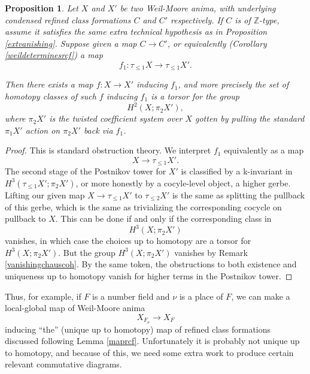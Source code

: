 \documentclass[12pt]{article}
\newtheorem{proposition}[theorem]{Proposition}
\theoremstyle{definition}
\newcommand{\mbb}{\mathbb}
\begin{document}
\begin{proposition}
Let $X$ and $X'$ be two Weil-Moore anima, with underlying condensed refined class formations $C$ and $C'$ respectively.  If $C$ is of $\mbb{Z}$-type, assume it satisfies the same extra technical hypothesis as in Proposition \ref{extvanishing}.  Suppose given a map $C\to C'$, or equivalently (Corollary \ref{weildeterminesrcf}) a map
$$f_1: \tau_{\leq 1}X \to \tau_{\leq 1}X'.$$

Then there exists a map $f:X\to X'$ inducing $f_1$, and more precisely the set of homotopy classes of such $f$ inducing $f_1$ is a torsor for the group  
$$H^2(X;\pi_2X'),$$
where $\pi_2X'$ is the twisted coefficient system over $X$ gotten by pulling the standard $\pi_1X'$ action on $\pi_2X'$ back via $f_1$.
\end{proposition}
\begin{proof}
This is standard obstruction theory.  We interpret $f_1$ equivalently as a map
$$X\to \tau_{\leq 1}X'.$$
The second stage of the Postnikov tower for $X'$ is classified by a k-invariant in $H^3(\tau_{\leq 1}X';\pi_2X')$, or more honestly by a cocyle-level object, a higher gerbe.  Lifting our given map $X\to \tau_{\leq 1}X'$ to $\tau_{\leq 2}X'$ is the same as splitting the pullback of this gerbe, which is the same as trivializing the corresponding cocycle on pullback to $X$.  This can be done if and only if the corresponding class in
$$H^3(X;\pi_2X')$$
vanishes, in which case the choices up to homotopy are a  torsor for $H^3(X;\pi_2X')$.  But the group $H^3(X;\pi_2X')$ vanishes by Remark \ref{vanishingchauscoh}.  By the same token, the obstructions to both existence and uniqueness up to homotopy vanish for higher terms in the Postnikov tower.
\end{proof}

Thus, for example, if $F$ is a number field and $\nu$ is a place of $F$, we can make a local-global map of Weil-Moore anima
$$X_{F_\nu} \to X_F$$
inducing ``the'' (unique up to homotopy) map of refined class formations discussed following Lemma \ref{maprcf}.  Unfortunately it is probably not unique up to homotopy, and because of this, we need some extra work to produce certain relevant commutative diagrams.
\end{document}
